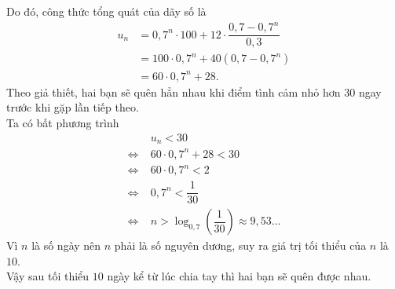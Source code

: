 \begin{ex}
{		Do đó, công thức tổng quát của dãy số là
		\allowdisplaybreaks
		\begin{align*}
			u_n &= 0{,}7^n \cdot 100 + 12 \cdot \dfrac{0{,}7 - 0{,}7^n}{0{,}3} \\
			&= 100 \cdot 0{,}7^n + 40\left(0{,}7 - 0{,}7^n\right) \\
			&= 60 \cdot 0{,}7^n + 28.
		\end{align*}
		Theo giả thiết, hai bạn sẽ quên hẳn nhau khi điểm tình cảm nhỏ hơn $30$ ngay trước khi gặp lần tiếp theo.\\ 
		Ta có bất phương trình
		\allowdisplaybreaks
		\begin{align*}
			& u_n < 30 \\
			\Leftrightarrow \;& 60 \cdot 0{,}7^n + 28 < 30 \\
			\Leftrightarrow \;& 60 \cdot 0{,}7^n < 2 \\
			\Leftrightarrow \;& 0{,}7^n < \dfrac{1}{30} \\
			\Leftrightarrow \;& n > \log_{0{,}7} \left( \dfrac{1}{30} \right) \approx 9{,}53 \dots
		\end{align*}
		Vì $n$ là số ngày nên $n$ phải là số nguyên dương, suy ra giá trị tối thiểu của $n$ là $10$.\\
		Vậy sau tối thiểu $10$ ngày kể từ lúc chia tay thì hai bạn sẽ quên được nhau.
	}
\end{ex}

